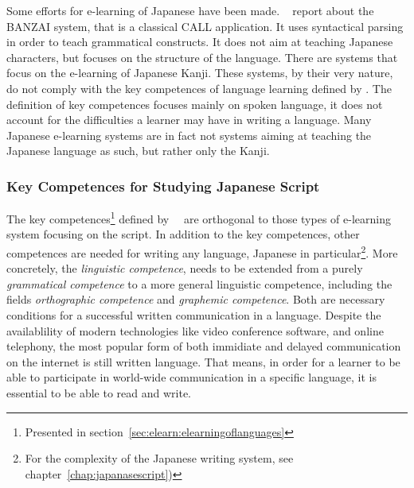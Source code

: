 Some efforts for e-learning of Japanese have been made.
~\citeyear{Nagata2002} report about the BANZAI system,
that is a classical CALL application. It uses syntactical parsing in order
to teach grammatical constructs. It does not aim at teaching Japanese
characters, but focuses on the structure of the language.
There are systems that focus on the e-learning of Japanese Kanji. 
These systems, by their very nature, do not comply with the key competences
of language learning defined by . The definition of
key competences focuses mainly on spoken language, it does not account for
the difficulties a learner may have in writing a language.
Many Japanese e-learning systems are in fact not systems aiming at teaching
the Japanese language as such, but rather only the Kanji.

\subsubsection{Key Competences for Studying Japanese Script}
\label{sec:elearn:keycompetencesforstudyingjapanesescript}

The key 
competences\footnote{Presented in 
section~\ref{sec:elearn:elearningoflanguages}} 
defined by~~\citeyear{Richert2007} are orthogonal to 
those types of e-learning system focusing on the script. 
In addition to the key competences, other competences are needed for writing any 
language, Japanese in 
particular\footnote{For the complexity of the Japanese writing system, 
see chapter~\ref{chap:japanasescript})}. 
More concretely, the \emph{linguistic competence}, needs to be extended
from a purely \emph{grammatical competence} to a more general linguistic 
competence, including the fields \emph{orthographic competence} 
and \emph{graphemic competence}. Both are necessary conditions for a successful 
written communication in a language. 
Despite the availablility of modern technologies like video conference software,
and online telephony, the most popular form of both immidiate and delayed 
communication on the internet is still written language. 
That means, in order for a learner to be able to participate in world-wide 
communication in a specific language, it is essential to be able to read and 
write.



